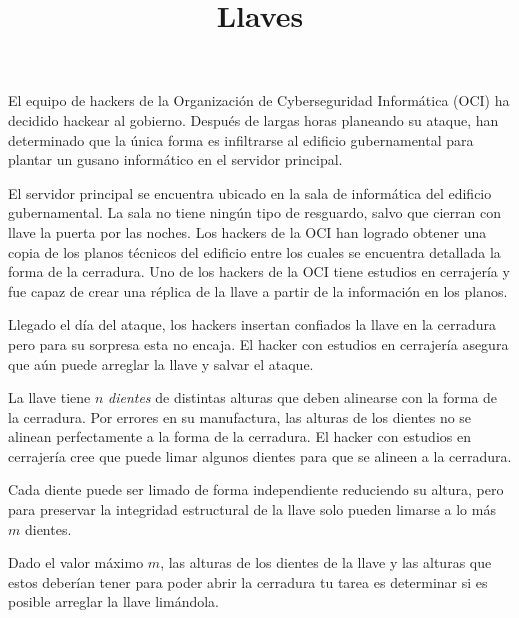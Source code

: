 \documentclass{oci}
\title{Llaves}
\begin{document}
\begin{problemDescription}
El equipo de hackers de la Organización de Cyberseguridad Informática (OCI)
ha decidido hackear al gobierno.
Después de largas horas planeando su ataque, han determinado que la única forma es infiltrarse
al edificio gubernamental para plantar un gusano informático en el servidor principal.

El servidor principal se encuentra ubicado en la sala de informática del edificio gubernamental.
La sala no tiene ningún tipo de resguardo, salvo que cierran con llave la puerta por las noches.
Los hackers de la OCI han logrado obtener una copia de los planos técnicos del edificio entre los
cuales se encuentra detallada la forma de la cerradura.
Uno de los hackers de la OCI tiene estudios en cerrajería y fue capaz de crear una réplica de la
llave a partir de la información en los planos.

Llegado el día del ataque, los hackers insertan confiados la llave en la cerradura pero para
su sorpresa esta no encaja.
El hacker con estudios en cerrajería asegura que aún puede arreglar la llave y salvar
el ataque.

La llave tiene $n$ \emph{dientes} de distintas alturas que deben alinearse con la forma de la
cerradura.
Por errores en su manufactura, las alturas de los dientes no se alinean perfectamente a la forma
de la cerradura.
El hacker con estudios en cerrajería cree que puede limar algunos dientes para que se alineen a la
cerradura.

Cada diente puede ser limado de forma independiente reduciendo su altura, pero para preservar
la integridad estructural de la llave solo pueden limarse a lo más $m$ dientes.

Dado el valor máximo $m$, las alturas de los dientes de la llave y las alturas que estos deberían
tener para poder abrir la cerradura tu tarea es determinar si es posible arreglar la llave
limándola.




\end{problemDescription}
\end{document}
